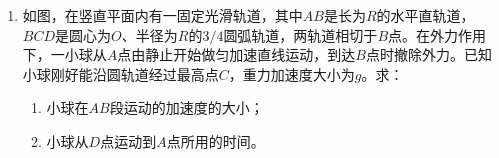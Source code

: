 \documentclass[\gkver]{gaokaozhenti}
\begin{document}
\begin{enumerate}
（1）根据表中数据，在图（b）中的方格纸上作图线。

（2）回答下列问题：（不要求写出计算或推导过程）

①已知点（0，0）在$(1/t)\text{-}x$图线上，从$(1/t)\text{-}x$图线看，$1/t$与$x$是什么关系？

②从理论上分析，小滑块刚脱离弹簧时的动能$E_{k}$与$1/t$是什么关系（不考虑摩擦力）？

③当弹簧长度改变量为$x$时，弹性势能$E_{p}$与相应的$E_{k}$是什么关系？

④综合考虑以上分析，$E_{p}$与$x$是什么关系？

\item
如图，在竖直平面内有一固定光滑轨道，其中$AB$是长为$R$的水平直轨道，$BCD$是圆心为$O$、半径为$R$的$3/4$圆弧轨道，两轨道相切于$B$点。在外力作用下，一小球从$A$点由静止开始做匀加速直线运动，到达$B$点时撤除外力。已知小球刚好能沿圆轨道经过最高点$C$，重力加速度大小为$g$。求：
\begin{enumerate}
	\item
	小球在$AB$段运动的加速度的大小；
	\item
	小球从$D$点运动到$A$点所用的时间。
\end{enumerate}
\end{enumerate}
\end{document}

